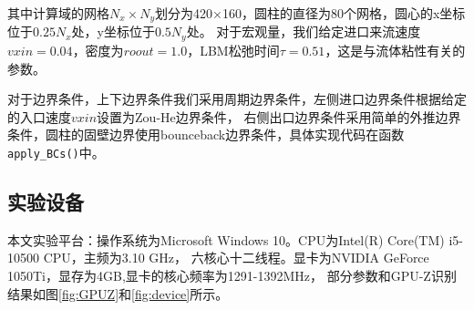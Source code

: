 \documentclass[UTF8]{ctexart}
\begin{document}
        其中计算域的网格$N_x \times N_y$划分为420×160，圆柱的直径为80个网格，圆心的x坐标位于$0.25N_x$处，y坐标位于$0.5N_y$处。
        对于宏观量，我们给定进口来流速度$vxin=0.04$，密度为$roout=1.0$，LBM松弛时间$\tau=0.51$，这是与流体粘性有关的参数。

        对于边界条件，上下边界条件我们采用周期边界条件，左侧进口边界条件根据给定的入口速度$vxin$设置为Zou-He边界条件，
        右侧出口边界条件采用简单的外推边界条件，圆柱的固壁边界使用bounceback边界条件，具体实现代码在函数\texttt{apply\_BCs()}中。

        \subsection{实验设备}
        本文实验平台：操作系统为Microsoft Windows 10。CPU为Intel(R) Core(TM) i5-10500 CPU，主频为3.10 GHz，
        六核心十二线程。显卡为NVIDIA GeForce 1050Ti，显存为4GB,显卡的核心频率为1291-1392MHz，
        部分参数和GPU-Z识别结果如图\ref{fig:GPUZ}和\ref{fig:device}所示。
        
\end{document}
